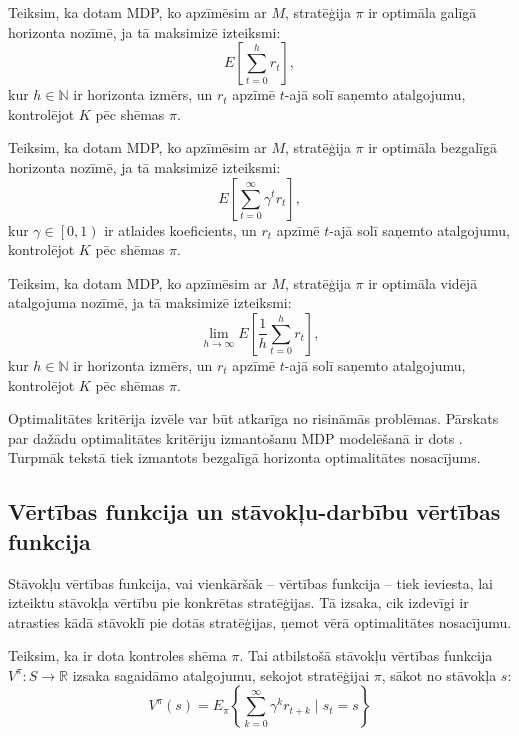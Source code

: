 \documentclass{ludis} %
\begin{document}
\begin{definicija}
Teiksim, ka dotam MDP, ko apzīmēsim ar $M$, stratēģija $\pi$ ir optimāla galīgā
horizonta nozīmē, ja tā maksimizē izteiksmi:
\[
	E\left[\sum_{t=0}^{h}r_t\right],
\]
kur $h \in \mathbb{N}$ ir horizonta izmērs, un $r_t$ apzīmē $t$-ajā solī saņemto
atalgojumu, kontrolējot $K$ pēc shēmas $\pi$.
\end{definicija}

\begin{definicija}
Teiksim, ka dotam MDP, ko apzīmēsim ar $M$, stratēģija $\pi$ ir optimāla
bezgalīgā horizonta nozīmē, ja tā maksimizē izteiksmi:
\[
	E\left[\sum_{t=0}^{\infty}\gamma^t r_t\right],
\]
kur $\gamma \in \left[0, 1\right)$ ir atlaides koeficients, un $r_t$ apzīmē
$t$-ajā solī saņemto atalgojumu, kontrolējot $K$ pēc shēmas $\pi$.
\end{definicija}

\begin{definicija}
Teiksim, ka dotam MDP, ko apzīmēsim ar $M$, stratēģija $\pi$ ir optimāla vidējā
atalgojuma nozīmē, ja tā maksimizē izteiksmi:
\[
	\lim\limits_{h \rightarrow \infty} E\left[\frac{1}{h}\sum_{t=0}^{h}r_t\right],
\]
kur $h \in \mathbb{N}$ ir horizonta izmērs, un $r_t$ apzīmē $t$-ajā solī saņemto
atalgojumu, kontrolējot $K$ pēc shēmas $\pi$.
\end{definicija}

Optimalitātes kritērija izvēle var būt atkarīga no risināmās problēmas. Pārskats
par dažādu optimalitātes kritēriju izmantošanu MDP modelēšanā ir dots
\autocite{koenig2002interaction}. Turpmāk tekstā tiek izmantots bezgalīgā
horizonta optimalitātes nosacījums.


\subsection{Vērtības funkcija un stāvokļu-darbību vērtības funkcija}
Stāvokļu vērtības funkcija, vai vienkāršāk -- vērtības funkcija -- tiek
ieviesta, lai izteiktu stāvokļa vērtību pie konkrētas stratēģijas. Tā izsaka,
cik izdevīgi ir atrasties kādā stāvoklī pie dotās stratēģijas, ņemot vērā
optimalitātes nosacījumu.
\begin{definicija}
Teiksim, ka ir dota kontroles shēma $\pi$. Tai atbilstošā stāvokļu vērtības
funkcija $V^\pi : S \rightarrow \mathbb{R}$ izsaka sagaidāmo atalgojumu, sekojot
stratēģijai $\pi$, sākot no stāvokļa $s$:
\begin{equation} \label{eq:vpi}
	V^\pi (s) = E_\pi \left\{ \sum_{k=0}^{\infty} \gamma^k r_{t+k} \mid s_t = s\right\}
\end{equation}
\end{definicija}
\end{document}
